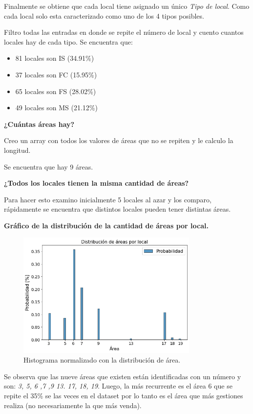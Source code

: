\documentclass[11pt,spanish]{article}
\begin{document}
Finalmente se obtiene que cada local tiene asignado un único \textit{Tipo de local}.
\vspace{2mm}
Como cada local solo esta caracterizado como uno de los 4 tipos posibles.

Filtro todas las entradas en donde se repite el número de local y cuento cuantos locales hay de cada tipo.
Se encuentra que:

\begin{itemize}
    \item 81 locales son IS (34.91\%)
    \item 37 locales son FC (15.95\%)
    \item 65 locales son FS (28.02\%)
    \item 49 locales son MS (21.12\%)
\end{itemize}

\vspace{3mm}
\textbf{¿Cuántas áreas hay?}
\vspace{3mm}

Creo un array con todos los valores de áreas que no se repiten y le calculo la longitud.

Se encuentra que hay 9 áreas.

\vspace{3mm}
\textbf{¿Todos los locales tienen la misma 
cantidad de áreas?}
\vspace{3mm}

Para hacer esto examino inicialmente 5 locales al azar y los comparo, rápidamente se encuentra que distintos locales pueden tener distintas áreas.

\vspace{3mm}

\textbf{Gráfico de la distribución de la cantidad de áreas por local.}

\vspace{3mm}

\begin{figure}[H]
    \centering
    \includegraphics[width=0.8\textwidth]{Exploratorio/distribucion_area_local.png}
    \caption{Histograma normalizado con la distribución de área.}
    \label{fig:my_label}
\end{figure}
Se observa que las nueve áreas que existen están identificadas con un número y son:
\textit{3, 5, 6 ,7 ,9 13. 17, 18, 19}. Luego, la más recurrente es el área 6 que se repite el 35\% se las veces en el dataset por lo tanto es el área que más gestiones realiza (no necesariamente la que más venda).
\end{document}
